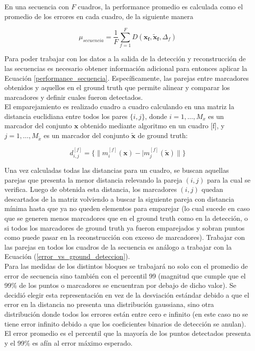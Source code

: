 En una secuencia con $F$ cuadros, la performance promedio es calculada como el promedio de los errores en cada cuadro, de la siguiente manera

\begin{equation} \label{performance_secuencia}
\mu_{secuencia} = \frac{1}{F}\sum_{f=1}^{F} D(\boldsymbol{x_{f}},\boldsymbol{\tilde{x}_{f}},\Delta_{f})
\end{equation}

Para poder trabajar con los datos a la salida de la detección y reconstrucción de las secuencias es necesario obtener información adicional para entonces aplicar la Ecuación \eqref{performance_secuencia}. Específicamente, las parejas entre marcadores obtenidos y aquellos en el ground truth que permite alinear y comparar los marcadores y definir cuales fueron detectados.
\\ 

El emparejamiento es realizado cuadro a cuadro calculando en una matriz la distancia euclidiana entre todos los pares $\{i,j\}$, donde $i=1,\ldots,M_{x}$ es un marcador del conjunto $\boldsymbol{x}$ obtenido mediante algoritmo en un cuadro [f], y $j=1,\ldots,M_{\tilde{x}}$ es un marcador del conjunto $\boldsymbol{\tilde{x}}$ de ground truth:

\begin{equation} \label{distancia_algoritmo_ground}
d_{i,j}^{[f]} = \{\|m_{i}^{[f]}(\boldsymbol{x})-|m_{j}^{[f]}(\boldsymbol{\tilde{x}})\|\}
\end{equation}

Una vez calculadas todas las distancias para un cuadro, se buscan aquellas parejas que presenta la menor distancia relevando la pareja $(i,j)$  para la cual se verifica. Luego de obtenida esta distancia, los marcadores $(i,j)$ quedan descartados de la matriz volviendo a buscar la siguiente pareja con distancia mínima hasta que ya no queden elementos para emparejar (lo cual sucede en caso que se generen menos marcadores que en el ground truth como en la detección, o si todos los marcadores de ground truth ya fueron emparejados y sobran puntos como puede pasar en la reconstrucción con exceso de marcadores). Trabajar con las parejas en todos los cuadros de la secuencia es análogo a trabajar con la Ecuación (\ref{error_vs_ground_deteccion}).
\\ 

Para las medidas de los distintos bloques se trabajará no solo con el promedio de error de secuencia sino también con el percentil 99 (magnitud que cumple que el 99\% de los puntos o marcadores se encuentran por debajo de dicho valor). Se decidió elegir esta representación en vez de la desviación estándar debido a que el error en la distancia no presenta una distribución gaussiana, sino otra distribución donde todos los errores están entre cero e infinito (en este caso no se tiene error infinito debido a que los coeficientes binarios de detección se anulan). El error promedio es el percentil que la mayoría de los puntos detectados presenta y el 99\% es afín al error máximo esperado.

